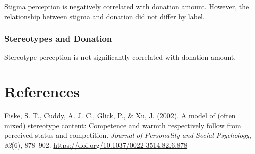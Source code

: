\documentclass[
  man,
  floatsintext,
  longtable,
  nolmodern,
  notxfonts,
  notimes,
  colorlinks=true,linkcolor=blue,citecolor=blue,urlcolor=blue]{apa7}
\newlength{\cslhangindent}
\newenvironment{CSLReferences}[2] %
 {\begin{list}{}{%
  \setlength{\itemindent}{0pt}
  \setlength{\leftmargin}{0pt}
  \setlength{\parsep}{0pt}
  \ifodd #1
   \setlength{\leftmargin}{\cslhangindent}
   \setlength{\itemindent}{-1\cslhangindent}
  \fi
  \setlength{\itemsep}{#2\baselineskip}}}
 {\end{list}}
\begin{document}
Stigma perception is negatively correlated with donation amount.
However, the relationship between stigma and donation did not differ by
label.

\begin{figure}

\caption{\label{fig-correlation-stigma-donation}}


\end{figure}%

\subsubsection{Stereotypes and Donation}\label{stereotypes-and-donation}

Stereotype perception is not significantly correlated with donation
amount.

\newpage

\section{References}\label{references}

\label{refs}
\begin{CSLReferences}{1}{0}
Fiske, S. T., Cuddy, A. J. C., Glick, P., \& Xu, J. (2002). A model of
(often mixed) stereotype content: {Competence} and warmth respectively
follow from perceived status and competition. \emph{Journal of
Personality and Social Psychology}, \emph{82}(6), 878--902.
\url{https://doi.org/10.1037/0022-3514.82.6.878}

\end{CSLReferences}
\end{document}
